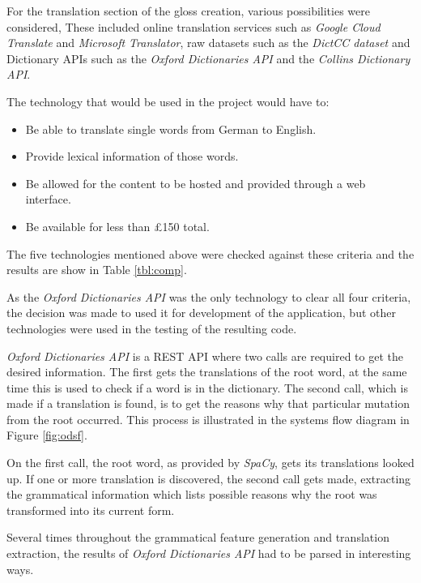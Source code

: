 For the translation section of the gloss creation, various possibilities were considered, These included online translation services such as \textit{Google Cloud Translate} and \textit{Microsoft Translator}, raw datasets such as the \textit{DictCC dataset} and Dictionary APIs such as the \textit{Oxford Dictionaries API} and the \textit{Collins Dictionary API}. 

The technology that would be used in the project would have to:
\begin{itemize}
\item Be able to translate single words from German to English.
\item Provide lexical information of those words.
\item Be allowed for the content to be hosted and provided through a web interface.
\item Be available for less than \pounds150 total.
\end{itemize}

The five technologies mentioned above were checked against these criteria and the results are show in Table \ref{tbl:comp}.



As the \textit{Oxford Dictionaries API} was the only technology to clear all four criteria, the decision was made to used it for development of the application, but other technologies were used in the testing of the resulting code.

\textit{Oxford Dictionaries API} is a REST API where two calls are required to get the desired information. The first gets the translations of the root word, at the same time this is used to check if a word is in the dictionary. The second call, which is made if a translation is found, is to get the reasons why that particular mutation from the root occurred. This process is illustrated in the systems flow diagram in Figure \ref{fig:odsf}.



On the first call, the root word, as provided by \textit{SpaCy}, gets its translations looked up. If one or more translation is discovered, the second call gets made, extracting the grammatical information which lists possible reasons why the root was transformed into its current form.

Several times throughout the grammatical feature generation and translation extraction, the results of \textit{Oxford Dictionaries API} had to be parsed in interesting ways. 

